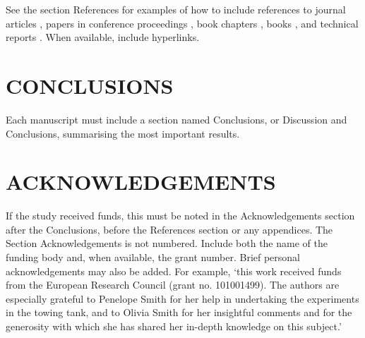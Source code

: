 \documentclass{article}
\begin{document}
See the section References for examples of how to include references to journal articles \citep[e.g.][]{Viola2013AMR,Viola2021OE,Viola2010IJSCTForces,Viola2013IJHFF,Viola2013IJNMF}, papers in conference proceedings \citep[e.g.][]{Viola2011CSYS}, book chapters \citep[e.g.]{Viola2013SNAMETrans}, books \citep[e.g.][]{Lanchester1907}, and technical reports \citep[e.g.][]{Carter1984}. When available, include hyperlinks. 


\section{CONCLUSIONS} \label{sec:conclusions}

Each manuscript must include a section named Conclusions, or Discussion and Conclusions, summarising the most important results. 


\section*{ACKNOWLEDGEMENTS}

If the study received funds, this must be noted in the Acknowledgements section after the Conclusions, before the References section or any appendices. The Section Acknowledgements is not numbered. Include both the name of the funding body and, when available, the grant number. Brief personal acknowledgements may also be added. For example, `this work received funds from the European Research Council (grant no. 101001499). The authors are especially grateful to Penelope Smith for her help in undertaking the experiments in the towing tank, and to Olivia Smith for her insightful comments and for the generosity with which she has shared her in-depth knowledge on this subject.'
\end{document}
